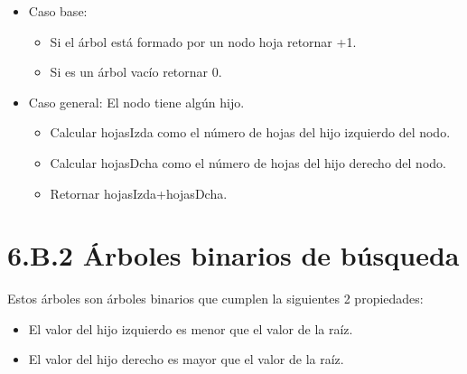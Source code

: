 \begin{itemize}
\begin{itemize}
\item Caso base: 
	\begin{itemize}
	\item Si el árbol está formado por un nodo hoja retornar +1.
	\item Si es un árbol vacío retornar 0.
	\end{itemize}
\item Caso general: El nodo tiene algún hijo.
	\begin{itemize}
	\item Calcular hojasIzda como el número de hojas del hijo izquierdo del nodo.
	\item Calcular hojasDcha como el número de hojas del hijo derecho del nodo.
	\item Retornar hojasIzda+hojasDcha.
	\end{itemize}
\end{itemize}
\end{itemize}







\section*{6.B.2 Árboles binarios de búsqueda}
\label{sec:ArbolesBinariosBusqueda}




Estos árboles son árboles binarios que cumplen la siguientes 2 propiedades:
\begin{itemize}
\item El valor del hijo izquierdo es menor que el valor de la raíz.
\item El valor del hijo derecho es mayor que el valor de la raíz.
\end{itemize}

